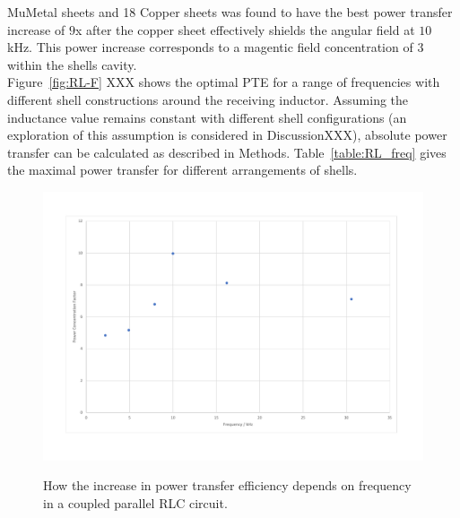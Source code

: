 \documentclass[11pt]{iopart}
\begin{document}
MuMetal sheets and 18 Copper sheets was found to have the best power
transfer increase of $9$x after the copper sheet effectively shields
the angular field at $10$ kHz. This power increase corresponds to a
magentic field concentration of $3$ within the shells cavity.\\
Figure~\ref{fig:RL-F} XXX shows the optimal PTE for a range of
frequencies with different shell constructions around the receiving
inductor.  Assuming the inductance value remains constant with
different shell configurations (an exploration of this assumption is
considered in DiscussionXXX), absolute power transfer can be
calculated as described in Methods.  Table~\ref{table:RL_freq} gives
the maximal power transfer for different arrangements of shells.\\

\begin{figure}
  \begin{center}
   \noindent\includegraphics[width=0.75\linewidth]{images/RLC-P.pdf}
  \label{fig:RLC-P}
  \end{center}
  \caption{How the increase in power transfer efficiency depends on
    frequency in a coupled parallel RLC circuit.}
\end{figure}
\end{document}
